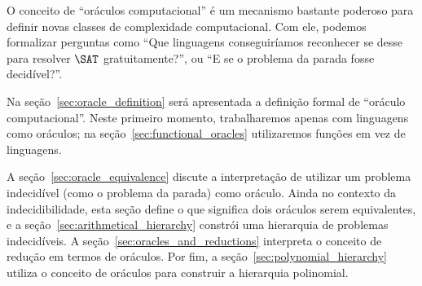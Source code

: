 O conceito de ``oráculos computacional'' é um mecanismo bastante poderoso
para definir novas classes de complexidade computacional.
Com ele,
podemos formalizar perguntas como
``Que linguagens conseguiríamos reconhecer
se desse para resolver $\SAT$ gratuitamente?'',
ou ``E se o problema da parada fosse decidível?''.

Na seção~\ref{sec:oracle_definition} será apresentada a definição formal
de ``oráculo computacional''.
Neste primeiro momento,
trabalharemos apenas com linguagens como oráculos;
na seção~\ref{sec:functional_oracles}
utilizaremos funções em vez de linguagens.

A seção~\ref{sec:oracle_equivalence}
discute a interpretação de utilizar um problema indecidível
(como o problema da parada)
como oráculo.
Ainda no contexto da indecidibilidade,
esta seção define o que significa dois oráculos serem equivalentes,
e a seção~\ref{sec:arithmetical_hierarchy}
constrói uma hierarquia de problemas indecidíveis.
A seção~\ref{sec:oracles_and_reductions}
interpreta o conceito de redução em termos de oráculos.
Por fim, a seção~\ref{sec:polynomial_hierarchy}
utiliza o conceito de oráculos para construir a hierarquia polinomial.
